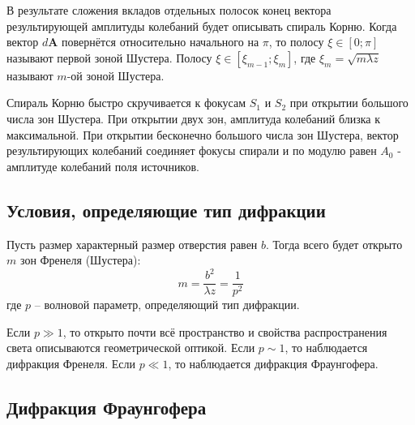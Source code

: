 В результате сложения вкладов отдельных полосок конец вектора результирующей амплитуды колебаний будет описывать спираль Корню. Когда вектор $d \boldsymbol{A}$ повернётся относительно начального на $\pi$, то полосу $\xi \in [0; \pi]$ называют первой зоной Шустера. Полосу $\xi \in [\xi_{m-1}; \xi_m]$, где $\xi_m = \sqrt{m \lambda z}$ называют $m$-ой зоной Шустера.

Спираль Корню быстро скручивается к фокусам $S_1$ и $S_2$ при открытии большого числа зон Шустера. При открытии двух зон, амплитуда колебаний близка к максимальной. При открытии бесконечно большого числа зон Шустера, вектор результирующих колебаний соединяет фокусы спирали и по модулю равен $A_0$ - амплитуде колебаний поля источников.

\subsection*{Условия, определяющие тип дифракции}

Пусть размер характерный размер отверстия равен $b$. Тогда всего будет открыто $m$ зон Френеля (Шустера):
$$
m = \frac{b^2}{\lambda z} = \frac{1}{p^2}
$$
где $p$ -- волновой параметр, определяющий тип дифракции.

Если $p \gg 1$, то открыто почти всё пространство и свойства распространения света описываются геометрической оптикой. Если $p \sim 1$, то наблюдается дифракция Френеля. Если $p \ll 1$, то наблюдается дифракция Фраунгофера.

\subsection*{Дифракция Фраунгофера}



